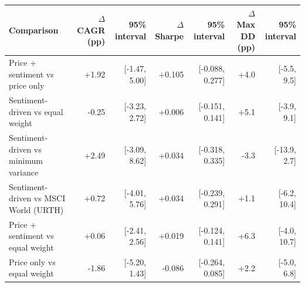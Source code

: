\begin{tabular}{lrrrrrr}
\toprule
Comparison & $\Delta$CAGR (pp) & 95\% interval & $\Delta$Sharpe & 95\% interval & $\Delta$Max DD (pp) & 95\% interval \\
\midrule
Price + sentiment vs price only & +1.92 & [-1.47, 5.00] & +0.105 & [-0.088, 0.277] & +4.0 & [-5.5, 9.5] \\
Sentiment-driven vs equal weight & -0.25 & [-3.23, 2.72] & +0.006 & [-0.151, 0.141] & +5.1 & [-3.9, 9.1] \\
Sentiment-driven vs minimum variance & +2.49 & [-3.09, 8.62] & +0.034 & [-0.318, 0.335] & -3.3 & [-13.9, 2.7] \\
Sentiment-driven vs MSCI World (URTH) & +0.72 & [-4.01, 5.76] & +0.034 & [-0.239, 0.291] & +1.1 & [-6.2, 10.4] \\
Price + sentiment vs equal weight & +0.06 & [-2.41, 2.56] & +0.019 & [-0.124, 0.141] & +6.3 & [-4.0, 10.7] \\
Price only vs equal weight & -1.86 & [-5.20, 1.43] & -0.086 & [-0.264, 0.085] & +2.2 & [-5.0, 6.8] \\
\bottomrule
\end{tabular}
